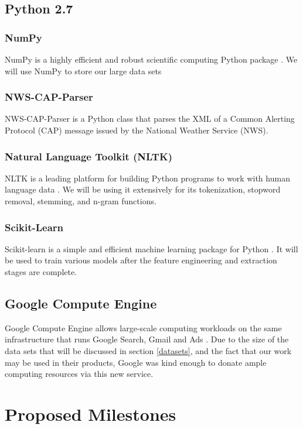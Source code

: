 \documentclass{article}
\begin{document}
\subsection{Python 2.7}
\subsubsection{NumPy}
NumPy is a highly efficient and robust scientific computing Python package \cite{numpy}. We will use NumPy to store our large data sets 
\subsubsection{NWS-CAP-Parser}
NWS-CAP-Parser is a Python class that parses the XML of a Common Alerting Protocol (CAP) message issued by the National Weather Service (NWS)\cite{nws-cap-parser}.

\subsubsection{Natural Language Toolkit (NLTK)}
NLTK is a leading platform for building Python programs to work with human language data \cite{nltk}. We will be using it extensively for its tokenization, stopword removal, stemming, and n-gram functions.

\subsubsection{Scikit-Learn}
Scikit-learn is a simple and efficient machine learning package for Python \cite{scikit-learn}. It will be used to train various models after the feature engineering and extraction stages are complete.

\subsection{Google Compute Engine}
Google Compute Engine allows large-scale computing workloads on the same infrastructure that runs Google Search, Gmail and Ads \cite{compute-engine}. Due to the size of the data sets that will be discussed in section \ref{datasets}, and the fact that our work may be used in their products, Google was kind enough to donate ample computing resources via this new service.

\section{Proposed Milestones}
\label{milestones}
\end{document}

